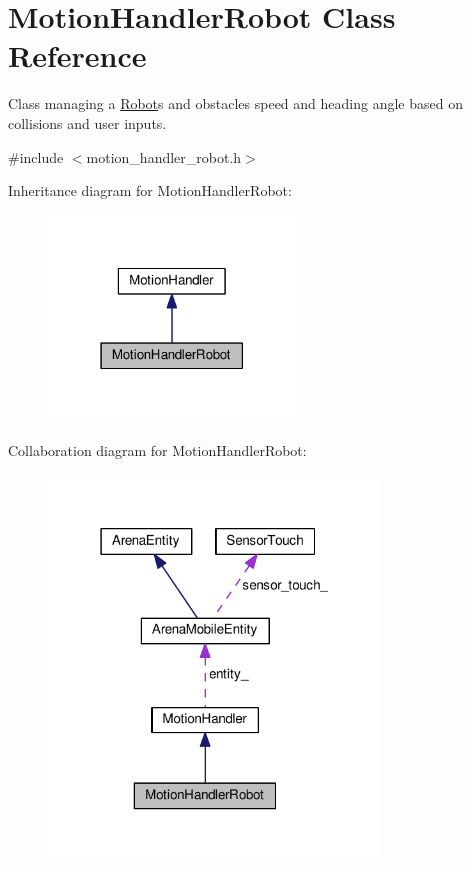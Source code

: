 \hypertarget{classMotionHandlerRobot}{}\section{Motion\+Handler\+Robot Class Reference}
\label{classMotionHandlerRobot}


Class managing a \hyperlink{classRobot}{Robot}\textquotesingle{}s and obstacle\textquotesingle{}s speed and heading angle based on collisions and user inputs.  




{\ttfamily \#include $<$motion\+\_\+handler\+\_\+robot.\+h$>$}



Inheritance diagram for Motion\+Handler\+Robot\+:
\nopagebreak
\begin{figure}[H]
\begin{center}
\leavevmode
\includegraphics[width=186pt]{classMotionHandlerRobot__inherit__graph}
\end{center}
\end{figure}


Collaboration diagram for Motion\+Handler\+Robot\+:
\nopagebreak
\begin{figure}[H]
\begin{center}
\leavevmode
\includegraphics[width=250pt]{classMotionHandlerRobot__coll__graph}
\end{center}
\end{figure}
